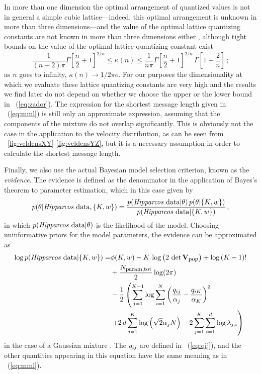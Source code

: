 In more than one dimension the optimal arrangement of quantized values
is not in general a simple cubic lattice---indeed, this optimal
arrangement is unknown in more than three dimensions---and the value of
the optimal lattice quantizing constants are not known in more than
three dimensions either \citep{conway92a}, although tight bounds on
the value of the optimal lattice quantizing constant exist
\citep{zador63,zador82}
\begin{equation}\label{eq:zador}
\frac{1}{(n+2)\pi} \Gamma\left[\frac{n}{2}+1\right]^{2/n} \leq
\kappa(n) \leq \frac{1}{n\pi} \Gamma\left[\frac{n}{2}+1\right]^{2/n}\,
\Gamma\left[1+\frac{2}{n}\right]\, ;
\end{equation}
as $n$ goes to infinity, $\kappa(n) \rightarrow 1/2\pi e$. For our
purposes the dimensionality at which we evaluate these lattice
quantizing constants are very high and the results we find later do
not depend on whether we choose the upper or the lower bound in
\eqnnumber~(\ref{eq:zador}). The expression for the shortest message
length given in \eqnnumber~(\ref{eq:mml}) is still only an approximate
expression, assuming that the components of the mixture do not overlap
significantly. This is obviously not the case in the application to
the velocity distribution, as can be seen from
\figuresname~\ref{fig:veldensXY}-\ref{fig:veldensYZ}, but it is a
necessary assumption in order to calculate the shortest message
length.

Finally, we also use the actual Bayesian model selection criterion,
known as the \emph{evidence}. The evidence is defined as the
denominator in the application of Bayes's theorem to parameter
estimation, which in this case given by
\begin{equation}\label{eq:bayesveldist}
p(\theta | \mbox{\emph{Hipparcos}\ data}, \{K, w\}) = 
\frac{p(\mbox{\emph{Hipparcos}\ data} | \theta)\,
p(\theta|\{K,w\})}{p(\mbox{\emph{Hipparcos}\ data}|\{K,w\})}\, ,
\end{equation}
in which $p(\mbox{\emph{Hipparcos}\ data} | \theta)$ is the likelihood of
the model. Choosing uninformative priors for the model parameters, the
evidence can be approximated as
\begin{equation}
\begin{split}
\log p(\mbox{\emph{Hipparcos}\ data}|\{K,w\}) = &
\phi(K,w) - K\, \log\left(2\,\det \mathbf{V}_{\mbox{{\footnotesize pop}}}\right)
+\log \left(K-1\right)!\\ & +\frac{N_{\mbox{{\footnotesize param,tot}}}}{2}\log (2\pi)
\\
& -\frac{1}{2} \left(\sum_{j=1}^{K-1} \log\sum_{i=1}^N 
\left(\frac{q_{ij}}{\alpha_j}-\frac{q_{iK}}{\alpha_K}\right)^2 \right. \\& \left.+2\, d\sum_{j=1}^K\log \left(\sqrt{2} \alpha_j N\right) -2 \sum_{j=1}^K \sum_{i=1}^d \log \lambda_{j,i}\right)
\end{split}
\end{equation}
in the case of a Gaussian mixture \citep{roberts98a}. The $q_{ij}$ are
defined in \eqnnumber~(\ref{eq:qij}), and the other quantities
appearing in this equation have the same meaning as in
\eqnnumber~(\ref{eq:mml}).

